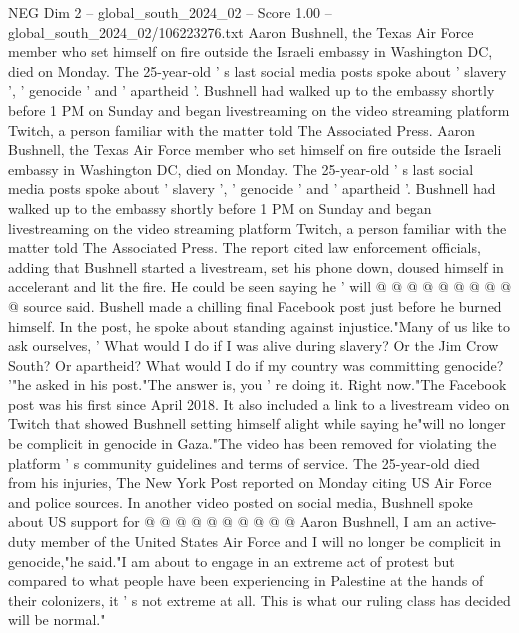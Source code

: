 \begin{textsample}{NEG Dim 2 – global\_south\_2024\_02 – Score 1.00 – global\_south\_2024\_02/106223276.txt}  \label{ex:f2_neg_411}
Aaron Bushnell, the Texas Air Force member who set himself on fire outside the Israeli embassy in Washington DC, died on Monday.
The 25-year-old ' s last social media posts spoke about ' slavery ', ' genocide ' and ' apartheid '.
Bushnell had walked up to the embassy shortly before 1 PM on Sunday and began livestreaming on the video streaming platform Twitch, a person familiar with the matter told The Associated Press.
Aaron Bushnell, the Texas Air Force member who set himself on fire outside the Israeli embassy in Washington DC, died on Monday.
The 25-year-old ' s last social media posts spoke about ' slavery ', ' genocide ' and ' apartheid '.
Bushnell had walked up to the embassy shortly before 1 PM on Sunday and began livestreaming on the video streaming platform Twitch, a person familiar with the matter told The Associated Press.
The report cited law enforcement officials, adding that Bushnell started a livestream, set his phone down, doused himself in accelerant and lit the fire.
He could be seen saying he ' will @ @ @ @ @ @ @ @ @ @ source said.
Bushell made a chilling final Facebook post just before he burned himself.
In the post, he spoke about standing against injustice."Many of us like to ask ourselves, ' What would I do if I was alive during slavery?
Or the Jim Crow South?
Or apartheid?
What would I do if my country was committing genocide? '"he asked in his post."The answer is, you ' re doing it.
Right now."The Facebook post was his first since April 2018.
It also included a link to a livestream video on Twitch that showed Bushnell setting himself alight while saying he"will no longer be complicit in genocide in Gaza."The video has been removed for violating the platform ' s community guidelines and terms of service.
The 25-year-old died from his injuries, The New York Post reported on Monday citing US Air Force and police sources.
In another video posted on social media, Bushnell spoke about US support for @ @ @ @ @ @ @ @ @ @ Aaron Bushnell, I am an active-duty member of the United States Air Force and I will no longer be complicit in genocide,"he said."I am about to engage in an extreme act of protest but compared to what people have been experiencing in Palestine at the hands of their colonizers, it ' s not extreme at all.
This is what our ruling class has decided will be normal."

\end{textsample}
